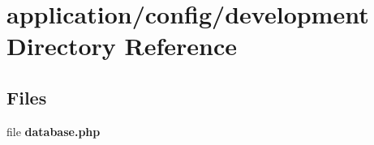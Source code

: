 \section{application/config/development Directory Reference}
\label{dir_aa3d03e39da9afc6d336ea3a1521fd4f}
\subsection*{Files}
\begin{DoxyCompactItemize}
\item 
file {\bf database.\-php}
\end{DoxyCompactItemize}
